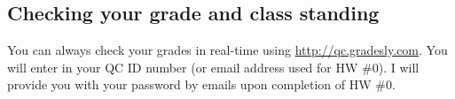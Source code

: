 \subsection*{Checking your grade and class standing}

You can always check your grades in real-time using \url{http://qc.gradesly.com}. You will enter in your QC ID number (or email address used for HW \#0). I will provide you with your password by emails upon completion of HW \#0.